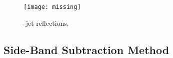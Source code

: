 \begin{figure}[bth]
\centering
\texttt{[image: missing]}
\caption{\Dzero-jet reflections.}
\label{fig:reflectionDZero_Dbin}
\end{figure}


%
%
%
%
%


\subsection{Side-Band Subtraction Method}
\label{sub_Bin_d_pT}

